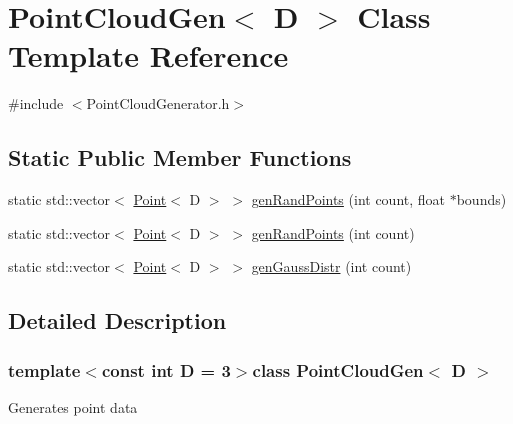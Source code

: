 \hypertarget{classPointCloudGen}{\section{Point\-Cloud\-Gen$<$ D $>$ Class Template Reference}
\label{classPointCloudGen}
}


{\ttfamily \#include $<$Point\-Cloud\-Generator.\-h$>$}

\subsection*{Static Public Member Functions}
\begin{DoxyCompactItemize}
\item 
static std\-::vector$<$ \hyperlink{structPoint}{Point}$<$ D $>$ $>$ \hyperlink{classPointCloudGen_a824a0daf811c25a219243c782b26eb74}{gen\-Rand\-Points} (int count, float $\ast$bounds)
\item 
static std\-::vector$<$ \hyperlink{structPoint}{Point}$<$ D $>$ $>$ \hyperlink{classPointCloudGen_a1d9b194ddbab0f7c1a60b0fef5eee8e5}{gen\-Rand\-Points} (int count)
\item 
static std\-::vector$<$ \hyperlink{structPoint}{Point}$<$ D $>$ $>$ \hyperlink{classPointCloudGen_a50a0d0e05abe67b2fe66ddf325ceb71e}{gen\-Gauss\-Distr} (int count)
\end{DoxyCompactItemize}


\subsection{Detailed Description}
\subsubsection*{template$<$const int D = 3$>$class Point\-Cloud\-Gen$<$ D $>$}

Generates point data 


